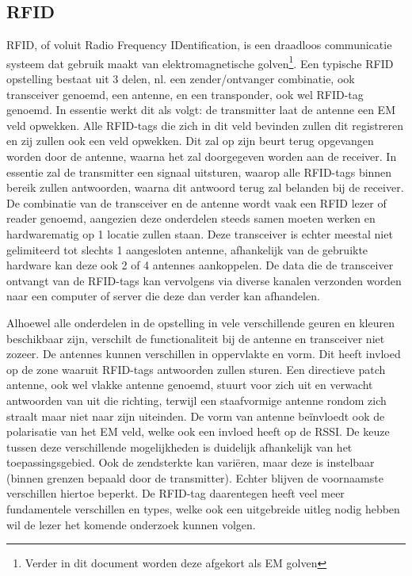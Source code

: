 \subsection{RFID}
\label{subsec:lit-rfid}
RFID, of voluit Radio Frequency IDentification, is een draadloos communicatie systeem dat gebruik maakt van elektromagnetische golven\footnote{Verder in dit document worden deze afgekort als EM golven}. Een typische RFID opstelling bestaat uit 3 delen, nl. een zender/ontvanger combinatie, ook transceiver genoemd, een antenne, en een transponder, ook wel RFID-tag  genoemd.\autocite{Auxcis2022}\autocite{SICK2022} In essentie werkt dit als volgt: de transmitter laat de antenne een EM veld opwekken. Alle RFID-tags die zich in dit veld bevinden zullen dit registreren en zij zullen ook een veld opwekken. Dit zal op zijn beurt terug opgevangen worden door de antenne, waarna het zal doorgegeven worden aan de receiver.
In essentie zal de transmitter een signaal uitsturen, waarop alle RFID-tags binnen bereik zullen antwoorden, waarna dit antwoord terug zal belanden bij de receiver. De combinatie van de transceiver en de antenne wordt vaak een RFID lezer of reader genoemd, aangezien deze onderdelen steeds samen moeten werken en hardwarematig op 1 locatie zullen staan.\autocite{Amster2021}
Deze transceiver is echter meestal niet gelimiteerd tot slechts 1 aangesloten antenne, afhankelijk van de gebruikte hardware kan deze ook 2 of 4 antennes aankoppelen. De data die de transceiver ontvangt van de RFID-tags kan vervolgens via diverse kanalen verzonden worden naar een computer of server die deze dan verder kan afhandelen.

Alhoewel alle onderdelen in de opstelling in vele verschillende geuren en kleuren beschikbaar zijn, verschilt de functionaliteit bij de antenne en transceiver niet zozeer. De antennes kunnen verschillen in oppervlakte en vorm. Dit heeft invloed op de zone waaruit RFID-tags antwoorden zullen sturen. Een directieve patch antenne, ook wel vlakke antenne genoemd, stuurt voor zich uit en verwacht antwoorden van uit die richting, terwijl een staafvormige antenne rondom zich straalt maar niet naar zijn uiteinden. De vorm van antenne beïnvloedt ook de polarisatie van het EM veld, welke ook een invloed heeft op de RSSI. De keuze tussen deze verschillende mogelijkheden is duidelijk afhankelijk van het toepassingsgebied. Ook de zendsterkte kan variëren, maar deze is instelbaar (binnen grenzen bepaald door de transmitter). Echter blijven de voornaamste verschillen hiertoe beperkt. De RFID-tag daarentegen heeft veel meer fundamentele verschillen en types, welke ook een uitgebreide uitleg nodig hebben wil de lezer het komende onderzoek kunnen volgen.

